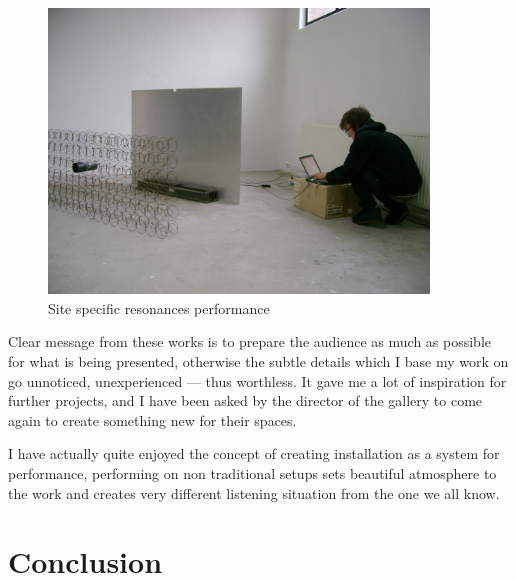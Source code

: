 \documentclass[12pt,a4paper,oneside]{report}
\begin{document}
\begin{figure}  
  \centering
    \includegraphics[width=0.9\textwidth]{img/sitespec}
	\caption{Site specific resonances performance}
	\label{fig:sitespec}
\end{figure}

Clear message from these works is to prepare the audience as much as possible for what is being presented, otherwise the subtle details which I base my work on go unnoticed, unexperienced --- thus worthless. It gave me a lot of inspiration for further projects, and I have been asked by the director of the gallery to come again to create something new for their spaces.

I have actually quite enjoyed the concept of creating installation as a system for performance, performing on non traditional setups sets beautiful atmosphere to the work and creates very different listening situation from the one we all know. 


\chapter{Conclusion}

\appendix


\onehalfspacing

 

\end{document}
